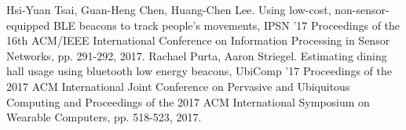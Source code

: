 \documentclass[Japanese]{dicomopapers}
\begin{document}
\begin{thebibliography}{20}
 Hsi-Yuan Tsai, Guan-Heng Chen, Huang-Chen Lee. Using low-cost, non-sensor-equipped BLE beacons to track people's movements, IPSN '17 Proceedings of the 16th ACM/IEEE International Conference on Information Processing in Sensor Networks, pp. 291-292, 2017.
 Rachael Purta, Aaron Striegel. Estimating dining hall usage using bluetooth low energy beacons, UbiComp '17 Proceedings of the 2017 ACM International Joint Conference on Pervasive and Ubiquitous Computing and Proceedings of the 2017 ACM International Symposium on Wearable Computers, pp. 518-523, 2017.
\end{thebibliography}
\end{document}
